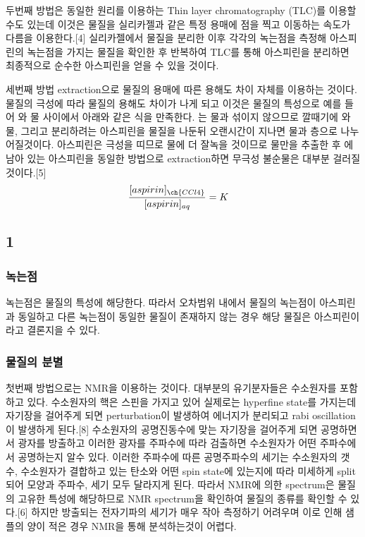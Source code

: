 \documentclass[%
 reprint,
 amsmath,amssymb,
 aps,
]{revtex4-2}
\begin{document}
 두번째 방법은 동일한 원리를 이용하는 Thin layer chromatography (TLC)를 이용할 수도 있는데 이것은 물질을 실리카젤과 같은 특정 용매에 점을 찍고 이동하는 속도가 다름을 이용한다.[4] 실리카젤에서 물질을 분리한 이후 각각의 녹는점을 측정해 아스피린의 녹는점을 가지는 물질을 확인한 후 반복하여 TLC를 통해 아스피린을 분리하면 최종적으로 순수한 아스피린을 얻을 수 있을 것이다.

 세번째 방법 extraction으로 물질의 용매에 따른 용해도 차이 자체를 이용하는 것이다. 물질의 극성에 따라 물질의 용해도 차이가 나게 되고 이것은 물질의 특성으로 예를 들어 와 물 사이에서 아래와 같은 식을 만족한다. 는 물과 섞이지 않으므로 깔때기에 와 물, 그리고 분리하려는 아스피린을 물질을 나둔뒤 오랜시간이 지나면 물과 층으로 나누어질것이다. 아스피린은 극성을 띠므로 물에 더 잘녹을 것이므로 물만을 추출한 후  에 남아 있는 아스피린을 동일한 방법으로 extraction하면 무극성 불순물은 대부분 걸러질것이다.[5]
\begin{align}
	\frac{[aspirin]_{\ch{CCl4}}}{[aspirin]_{aq}} &= K
\end{align}

\subsection{\label{sec:level2}1}
\subsubsection{\label{sec:level3}녹는점}
 녹는점은 물질의 특성에 해당한다. 따라서 오차범위 내에서 물질의 녹는점이 아스피린과 동일하고 다른 녹는점이 동일한 물질이 존재하지 않는 경우 해당 물질은 아스피린이라고 결론지을 수 있다.

\subsubsection{\label{sec:level3}물질의 분별}
 첫번째 방법으로는 NMR을 이용하는 것이다. 대부분의 유기분자들은 수소원자를 포함하고 있다. 수소원자의 핵은 스핀을 가지고 있어 실제로는 hyperfine state를 가지는데 자기장을 걸어주게 되면 perturbation이 발생하여 에너지가 분리되고 rabi oscillation이 발생하게 된다.[8] 수소원자의 공명진동수에 맞는 자기장을 걸어주게 되면 공명하면서 광자를 방출하고 이러한 광자를 주파수에 따라 검출하면 수소원자가 어떤 주파수에서 공명하는지 알수 있다. 이러한 주파수에 따른 공명주파수의 세기는 수소원자의 갯수, 수소원자가 결합하고 있는 탄소와 어떤 spin state에 있는지에 따라 미세하게 split되어 모양과 주파수, 세기 모두 달라지게 된다. 따라서 NMR에 의한 spectrum은 물질의 고유한 특성에 해당하므로 NMR spectrum을 확인하여 물질의 종류를 확인할 수 있다.[6] 하지만 방출되는 전자기파의 세기가 매우 작아 측정하기 어려우며 이로 인해 샘플의 양이 적은 경우 NMR을 통해 분석하는것이 어렵다.
\end{document}
